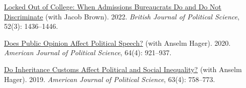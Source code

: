 \documentclass[letterpaper, 10pt]{article}
\begin{document}
\begin{etaremune}
  \item \href{https://www.cambridge.org/core/journals/british-journal-of-political-science/article/locked-out-of-college-when-admissions-bureaucrats-do-and-do-not-discriminate/47318737B56F71B2C9F00C279812759C}{Locked Out of College: When Admissions Bureaucrats Do and Do Not Discriminate} (with Jacob Brown). 2022. \textit{British Journal of Political Science}, 52(3): 1436--1446.
  \item \href{https://onlinelibrary.wiley.com/doi/abs/10.1111/ajps.12516}{Does Public Opinion Affect Political Speech?} (with Anselm Hager). 2020. \textit{American Journal of Political Science}, 64(4): 921--937.
  \item \href{https://onlinelibrary.wiley.com/doi/pdf/10.1111/ajps.12460}{Do Inheritance Customs Affect Political and Social Inequality?} (with Anselm Hager). 2019. \textit{American Journal of Political Science}, 63(4): 758--773.
\end{etaremune}

\vspace*{-0.2cm}
\end{document}

